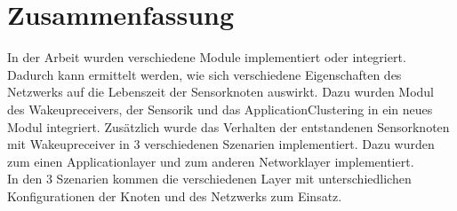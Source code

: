 \chapter{Zusammenfassung}

In der Arbeit wurden verschiedene Module implementiert oder integriert. Dadurch kann ermittelt werden, wie sich verschiedene Eigenschaften des Netzwerks auf die Lebenszeit der Sensorknoten auswirkt. Dazu wurden Modul des Wakeupreceivers, der Sensorik und das ApplicationClustering in ein neues Modul integriert. Zusätzlich wurde das Verhalten der entstandenen Sensorknoten mit Wakeupreceiver in 3 verschiedenen Szenarien implementiert. Dazu wurden zum einen Applicationlayer und zum anderen Networklayer implementiert.\\
In den 3 Szenarien kommen die verschiedenen Layer mit unterschiedlichen Konfigurationen der Knoten und des Netzwerks zum Einsatz. 